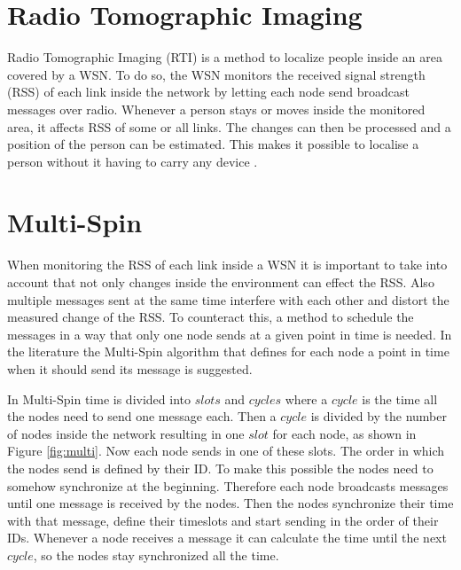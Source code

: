 

\section{Radio Tomographic Imaging}
Radio Tomographic Imaging (RTI) is a method to localize people inside an area covered by a WSN. To do so, the WSN monitors the received signal strength (RSS) of each link inside the network by letting each node send broadcast messages over radio. Whenever a person stays or moves inside the monitored area, it affects RSS of some or all links. The changes can then be processed and a position of the person can be estimated. This makes it possible to localise a person without it having to carry any device \cite{RtiMulti}.
\section{Multi-Spin}
When monitoring the RSS of each link inside a WSN it is important to take into account that not only changes inside the environment can effect the RSS. Also multiple messages sent at the same time interfere with each other and distort the measured change of the RSS. To counteract this, a method to schedule the messages in a way that only one node sends at a given point in time is needed. In the literature the Multi-Spin\citep{RtiMulti} algorithm that defines for each node a point in time when it should send its message is suggested.

In Multi-Spin time is divided into $slots$ and $cycles$ where a $cycle$ is the time all the nodes need to send one message each. Then a $cycle$ is divided by the number of nodes inside the network resulting in one $slot$ for each node, as shown in Figure \ref{fig:multi}. Now each node sends in one of these slots. The order in which the nodes send is defined by their ID. To make this possible the nodes need to somehow synchronize at the beginning. Therefore each node broadcasts messages until one message is received by the nodes. Then the nodes synchronize their time with that message, define their timeslots and start sending in the order of their IDs. Whenever a node receives a message it can calculate the time until the next $cycle$, so the nodes stay synchronized all the time.  \cite{RtiMulti}

